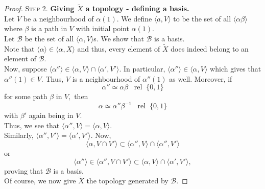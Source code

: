 \documentclass[12pt]{article}
\newcommand{\rel}{\;\;\operatorname{rel}\;}
\begin{document}
\begin{proof}
\textsc{Step 2.} \textbf{Giving $\tilde{X}$ a topology - defining a basis.}\\
Let $V$ be a neighbourhood of $\alpha(1).$ We define $\langle a, V\rangle$ to be the set of all $\langle \alpha\beta\rangle$ where $\beta$ is a path in $V$ with initial point $\alpha(1).$\\
Let $\mathcal{B}$ be the set of all $\langle \alpha, V\rangle$s. We show that $\mathcal{B}$	is a basis.\\
Note that $\langle \alpha\rangle \in \langle \alpha, X\rangle$ and thus, every element of $\tilde{X}$ does indeed belong to an element of $\mathcal{B}.$\\
Now, suppose $\langle \alpha''\rangle \in \langle \alpha, V\rangle \cap \langle \alpha', V'\rangle.$ In particular, $\langle \alpha''\rangle \in \langle \alpha, V\rangle$ which gives that $\alpha''(1) \in V.$ Thus, $V$ is a neighbourhood of $\alpha''(1)$ as well. Moreover, if 
\begin{equation*} 
	\alpha'' \simeq \alpha\beta\rel\{0, 1\}
\end{equation*} 
for some path $\beta$ in $V,$ then 
\begin{equation*} 
	\alpha \simeq \alpha''\beta^{-1}\rel\{0, 1\}
\end{equation*} with $\beta'$ again being in $V.$\\
Thus, we see that $\langle \alpha'', V\rangle = \langle \alpha, V\rangle.$\\
Similarly, $\langle \alpha'', V'\rangle = \langle \alpha', V'\rangle.$ Now,
\begin{equation*} 
	\langle \alpha, V\cap V'\rangle \subset\langle \alpha'', V\rangle\cap\langle \alpha'', V'\rangle
\end{equation*}
or
\begin{equation*} 
	\langle \alpha''\rangle \in \langle \alpha'', V\cap V'\rangle \subset\langle \alpha, V\rangle\cap\langle \alpha', V'\rangle,
\end{equation*}
proving that $\mathcal{B}$ is a basis.\\
Of course, we now give $\tilde{X}$ the topology generated by $\mathcal{B}.$

\dotfill


\end{proof}
\end{document}
